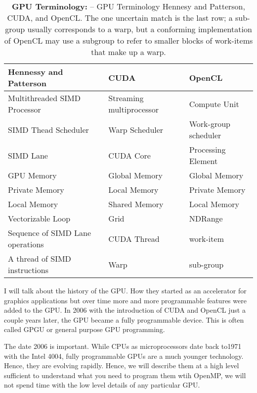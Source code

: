 \begin{table}[!htbp]
\centering
\caption{\textbf{GPU Terminology: } 
-- \small
GPU Terminology Hennesy and Patterson, CUDA, and 
OpenCL.   The one uncertain match is the last row;
a sub-group usually corresponds to a warp, but a conforming implementation of OpenCL 
may use a subgroup to refer to smaller blocks of work-items that make up a warp.}
\label{table:GPUjargon}
\begin{tabular}{|l|l|l|}
\hline
\textbf{Hennessy and Patterson}  & \textbf{CUDA} & \textbf{OpenCL} \\
\hline
Multithreaded SIMD Processor    & Streaming multiprocessor & Compute Unit \\
\hline
SIMD Thead Scheduler               & Warp Scheduler                 & Work-group scheduler \\
\hline
SIMD Lane                                  & CUDA Core                        & Processing Element \\
\hline
GPU Memory                              & Global Memory                   & Global Memory \\
\hline
Private Memory                          & Local Memory                     & Private Memory \\
\hline
Local Memory                            & Shared Memory                   & Local Memory \\
\hline
Vectorizable Loop                       & Grid                                     & NDRange \\
\hline
Sequence of SIMD Lane operations & CUDA Thread                & work-item \\
\hline
A thread of SIMD instructions            & Warp                              & sub-group \\
\hline
\end{tabular}
\end{table}








I will talk about the history of the GPU.  How they started as an accelerator for graphics applications but over time
more and more programmable features were added to the GPU.  In 2006 with the introduction of CUDA and 
OpenCL just a couple years later, the GPU became a fully programmable device.   This is often called GPGU or
general purpose GPU programming.

The date 2006 is important.  While CPUs as microprocessors date back to1971 with the Intel 4004, fully
programmable GPUs are a much younger technology.  Hence, they are evolving rapidly.  Hence, we will describe them
at a high level sufficient to understand what you need to program them wtih OpenMP, we will not spend time with the low
level details of any particular GPU.   

